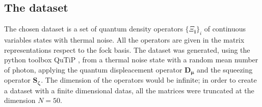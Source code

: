 \documentclass[%
    twoside, 
    a4paper
    ]{article}
\begin{document}
    \subsection{The dataset}
        The chosen dataset is a set of quantum density operators $\{ \bm{\varXi_i} \}_i$ of continuous
        variables states with thermal noise. All the operators are given in the matrix representations
        respect to the fock basis.
        The dataset was generated, using the python toolbox QuTiP \cite{Johansson_2012,Johansson_2013},
        from a thermal noise state with a random mean number of photon, applying the 
        quantum displeacement operator $\bm{D_{\mu}}$ and the squeezing operator 
        $\bm{S_{\zeta}}$. The dimension of the operators would be infinite; in order to 
        create a dataset with a finite dimensional datas, all the matrices were truncated
        at the dimension $N=50$.
\end{document}

